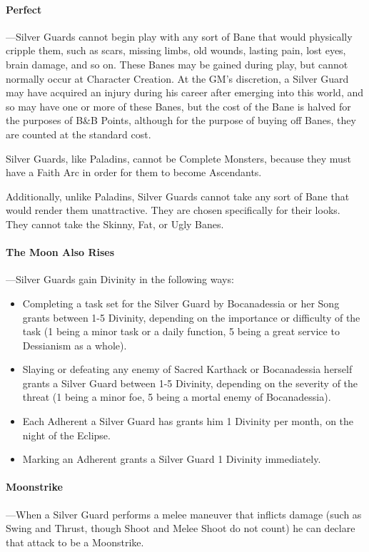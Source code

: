 \documentclass[oneside,11pt,english]{book}
\begin{document}
\paragraph{Perfect}
---\quad Silver Guards cannot begin play with any sort of Bane that would physically cripple them, such 
as scars, missing limbs, old wounds, lasting pain, lost eyes, brain damage, and so on. These Banes 
may be gained during play, but cannot normally occur at Character Creation. At the GM's 
discretion, a Silver Guard may have acquired an injury during his career after emerging into this 
world, and so may have one or more of these Banes, but the cost of the Bane is halved for the 
purposes of B\&B Points, although for the purpose of buying off Banes, they are counted at the 
standard cost. 


Silver Guards, like Paladins, cannot be Complete Monsters, because they must have a Faith Arc
in order for them to become Ascendants. 


Additionally, unlike Paladins, Silver Guards cannot take any sort of Bane that would render them unattractive. They are chosen specifically for their looks. They cannot take the Skinny, Fat, or Ugly Banes. 
\paragraph{The Moon Also Rises}
---\quad Silver Guards gain Divinity in the following ways: 
\begin{itemize}
\item Completing a task set for the Silver Guard by Bocanadessia or her Song grants between 
1-5 Divinity, depending on the importance or difficulty of the task (1 being a minor task 
or a daily function, 5 being a great service to Dessianism as a whole). 
\item Slaying or defeating any enemy of Sacred Karthack or Bocanadessia herself grants a 
Silver Guard between 1-5 Divinity, depending on the severity of the threat (1 being a 
minor foe, 5 being a mortal enemy of Bocanadessia). 
\item Each Adherent a Silver Guard has grants him 1 Divinity per month, on the night of the 
Eclipse. 
\item Marking an Adherent grants a Silver Guard 1 Divinity immediately. 
\end{itemize}
\paragraph{Moonstrike}
---\quad When a Silver Guard performs a melee maneuver that inflicts damage (such as Swing and Thrust, 
though Shoot and Melee Shoot do not count) he can declare that attack to be a Moonstrike. 
\end{document}
